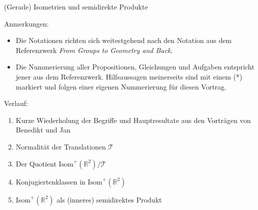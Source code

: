 \documentclass[a4paper, ngerman, 12pt]{article}
\begin{document}
\begin{center}
    \Large\bfseries

    (Gerade) Isometrien und semidirekte Produkte
\end{center}

\begin{framed}
    \noindent Anmerkungen: 
    \begin{itemize}
        \item Die Notationen richten sich weitestgehend nach den Notation aus dem Referenzwerk \textit{From Groups to Geometry and Back}. 
        \item Die Nummerierung aller Propositionen, Gleichungen und Aufgaben entspricht jener aus dem Referenzwerk. Hilfsaussagen meinerseits sind mit einem (*) markiert und folgen einer eigenen Nummerierung für diesen Vortrag. 
    \end{itemize}
\end{framed}

\begin{framed}
    \noindent Verlauf:
    \begin{enumerate}
        \item Kurze Wiederholung der Begriffe und Hauptresultate aus den Vorträgen von Benedikt und Jan
        \item Normalität der Translationen \(\mathcal T\)
        \item Der Quotient \(\mathrm{Isom}^+(\mathbb R^2)/\mathcal T\)
        \item Konjugiertenklassen in \(\mathrm{Isom}^+(\mathbb R^2)\)
        \item \(\mathrm{Isom}^+(\mathbb R^2)\) als (inneres) semidirektes Produkt
    \end{enumerate}
\end{framed}
\end{document}
